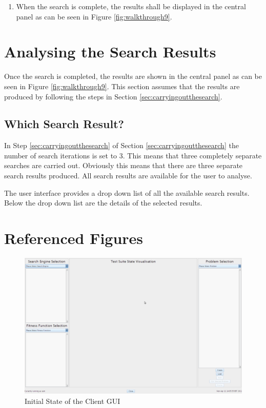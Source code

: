 \begin{enumerate}
\item When the search is complete, the results shall be displayed in the central panel as can be seen in Figure \ref{fig:walkthrough9}.

\end{enumerate}

\section{Analysing the Search Results}

Once the search is completed, the results are shown in the central panel as can be seen in Figure \ref{fig:walkthrough9}.
This section assumes that the results are produced by following the steps in Section \ref{sec:carryingoutthesearch}.

\subsection{Which Search Result?}

In Step \ref{sec:carryingoutthesearch} of Section \ref{sec:carryingoutthesearch} the number of search iterations is set to 3.
This means that three completely separate searches are carried out.
Obviously this means that there are three separate search results produced.
All search results are available for the user to analyse.

The user interface provides a drop down list of all the available search results.
Below the drop down list are the details of the selected results.

\clearpage
\section{Referenced Figures}
\begin{figure}[h!]
  \includegraphics[width=\textwidth]{walkthrough1.png}
 \caption{Initial State of the Client GUI}
 \label{fig:walkthrough1}
\end{figure}

